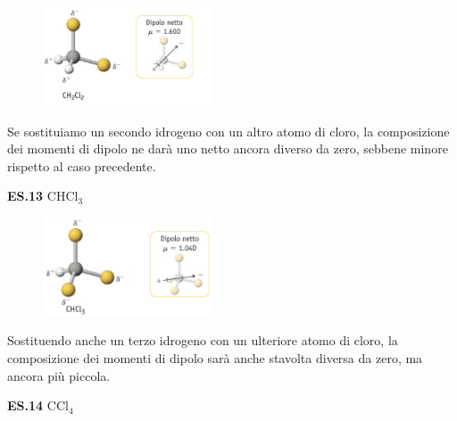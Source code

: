 \hspace{0.5cm}\begin{minipage}{0.2\textwidth}
\begin{figure}[H]
\includegraphics[width=5cm]{immagini/CH_2Cl_2.png}
\end{figure}
\end{minipage} \hfill
\begin{minipage}{0.5\textwidth}
Se sostituiamo un secondo idrogeno con un altro atomo di cloro, la composizione dei momenti di dipolo ne darà uno netto ancora diverso da zero, sebbene minore rispetto al caso precedente.
\end{minipage}

\vspace{0.2cm}\textbf{ES.13} CHCl$_3$

\hspace{0.5cm}\begin{minipage}{0.2\textwidth}
\begin{figure}[H]
\includegraphics[width=5cm]{immagini/CHCl_3.png}
\end{figure}
\end{minipage} \hfill
\begin{minipage}{0.5\textwidth}
Sostituendo anche un terzo idrogeno con un ulteriore atomo di cloro, la composizione dei momenti di dipolo sarà anche stavolta diversa da zero, ma ancora più piccola.
\end{minipage}

\vspace{0.2cm}\textbf{ES.14} CCl$_4$

